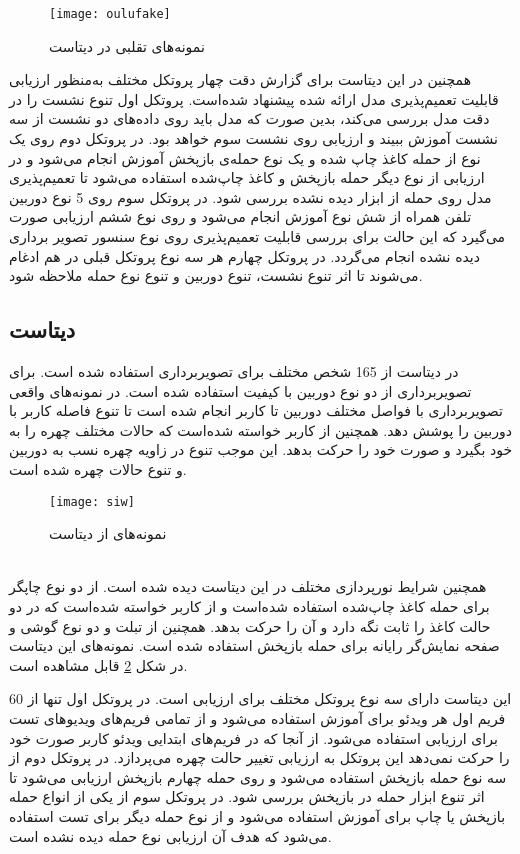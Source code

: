  
  \begin{figure}[h]
 	\centerline{\texttt{[image: oulufake]}}
 	\caption{نمونه‌های تقلبی در دیتاست  \cite{boulkenafet2017oulu} }
 	\label{fig:oulufake}
 \end{figure}
 
همچنین در این دیتاست برای گزارش دقت چهار پروتکل مختلف به‌منظور ارزیابی قابلیت تعمیم‌پذیری مدل ارائه شده پیشنهاد شده‌است. پروتکل اول تنوع نشست را در دقت مدل بررسی می‌کند، بدین صورت که مدل باید روی داده‌های دو نشست از سه نشست آموزش ببیند و ارزیابی روی نشست سوم خواهد بود. در پروتکل دوم روی یک نوع از حمله کاغذ چاپ شده و یک نوع حمله‌ی بازپخش آموزش انجام می‌شود و در ارزیابی از نوع دیگر حمله باز‌پخش و کاغذ چاپ‌شده استفاده می‌شود تا تعمیم‌پذیری مدل روی حمله از ابزار دیده نشده بررسی شود. در پروتکل سوم روی 5 نوع دوربین تلفن همراه از شش نوع آموزش انجام می‌شود و روی نوع ششم ارزیابی صورت می‌گیرد که این حالت برای بررسی قابلیت تعمیم‌پذیری روی نوع سنسور تصویر برداری دیده نشده انجام می‌گردد. در پروتکل چهارم هر سه نوع پروتکل قبلی در هم ادغام می‌شوند تا اثر تنوع نشست، تنوع دوربین و تنوع نوع حمله ملاحظه شود.
\subsection{دیتاست }
در دیتاست 
\cite{liu2018learning}
از 165 شخص مختلف برای تصویربرداری استفاده شده است. برای تصویربرداری از دو نوع دوربین با کیفیت استفاده شده است. در نمونه‌های واقعی تصویر‌برداری با فواصل مختلف دوربین تا کاربر انجام شده است تا تنوع فاصله کاربر با دوربین را پوشش دهد. همچنین از کاربر خواسته شده‌است که حالات مختلف چهره را به خود بگیرد و صورت خود را حرکت بدهد. این موجب تنوع در زاویه چهره نسب به دوربین و تنوع حالات چهره شده است.
  \begin{figure}[h]
	\centerline{\texttt{[image: siw]}}
	\caption{نمونه‌های از دیتاست  \cite{liu2018learning} }
	\label{fig:siw}
\end{figure}
\\

 همچنین شرایط نورپردازی مختلف در این دیتاست دیده شده است. از دو نوع چاپگر برای حمله کاغذ چاپ‌شده استفاده شده‌است و از کاربر خواسته شده‌است که در دو حالت کاغذ را ثابت نگه دارد و آن را حرکت بدهد. همچنین از تبلت و دو نوع گوشی و صفحه نمایش‌گر رایانه برای حمله بازپخش استفاده شده است. نمونه‌های این دیتاست در  شکل 
\ref{fig:siw}
قابل مشاهده است. 


این دیتاست دارای سه نوع پروتکل مختلف برای ارزیابی است. در پروتکل اول تنها از 60 فریم اول هر ویدئو برای آموزش استفاده می‌شود و از تمامی فریم‌های ویدیوهای تست برای ارزیابی استفاده می‌شود. از آنجا که در فریم‌های ابتدایی ویدئو کاربر صورت خود را حرکت نمی‌دهد این پروتکل به ارزیابی تغییر حالت چهره می‌پردازد. در پروتکل دوم از سه نوع حمله بازپخش استفاده می‌شود و روی حمله چهارم بازپخش ارزیابی می‌شود تا اثر تنوع ابزار حمله در بازپخش بررسی شود. در پروتکل سوم از یکی از انواع حمله بازپخش یا چاپ برای آموزش استفاده می‌شود و از نوع حمله دیگر برای تست استفاده می‌شود که هدف آن ارزیابی نوع حمله دیده نشده است. 





 











 












